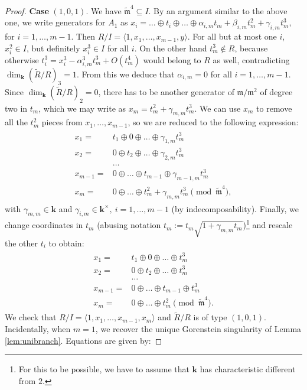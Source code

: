 \documentclass{compositio}
\renewcommand{\k}{\mathbf k}
\newcommand{\m}{\mathfrak m}
\newcommand{\tR}{\widetilde{R}}
\newcommand{\tm}{\widetilde{\mathfrak m}}
\theoremstyle{plain}
\theoremstyle{definition}
\theoremstyle{remark}
\begin{document}
\begin{proof}
 \smallskip
 
 \textbf{Case} $(1,0,1)$. We have $\tm^4\subseteq I$. By an argument similar to the above one, we write generators for $A_1$ as $x_i=\ldots\oplus t_i\oplus\ldots \oplus\alpha_{i,m}t_m+\beta_{i,m}t_m^2+\gamma_{i,m}t_m^3$, for $i=1,\ldots,m-1$.
 Then $R/I=\langle 1,x_1,\ldots,x_{m-1},y\rangle$. For all but at most one $i$, $x_i^2\in I$, but definitely $x_i^3\in I$ for all $i$. On the other hand $t_m^3\notin R$, because otherwise $t_i^3=x_i^3-\alpha_{i,m}^3t_m^3+O(t_m^4)$ would belong to $R$ as well, contradicting $\dim_\k(\tR/R)_3=1$. From this we deduce that $\alpha_{i,m}=0$ for all $i=1,\ldots,m-1$. Since $\dim_\k(\tR/R)_2=0$, there has to be another generator of $\m/\m^2$ of degree two in $t_m$, which we may write as $x_m=t_m^2+\gamma_{m,m}t_m^3$. We can use $x_m$ to remove all the $t_m^2$ pieces from $x_1,\ldots,x_{m-1}$, so we are reduced to the following expression:
  \begin{align}\label{coordIII-cs}
 \begin{split}
  x_1= & t_1\oplus0\oplus\ldots\oplus \gamma_{1,m}t_m^3\\
  x_2= & 0\oplus t_2\oplus\ldots\oplus \gamma_{2,m}t_m^3\\
  &\ldots\\
  x_{m-1}= & 0\oplus\ldots\oplus t_{m-1}\oplus \gamma_{m-1,m}t_m^3\\
  x_m= & 0\oplus\ldots\oplus t_m^2+\gamma_{m,m}t_m^3 \pmod{\tm^4},
  \end{split}
 \end{align}
 with $\gamma_{m,m}\in\k$ and $\gamma_{i,m}\in\k^\times,\ i=1,\ldots,m-1$ (by indecomposability). Finally, we change coordinates in $t_m$ (abusing notation $t_m:=t_m\sqrt{1+\gamma_{m,m}t_m}$)\footnote{For this to be possible, we have to assume that $\k$ has characteristic different from $2$.} and rescale the other $t_i$ to obtain:
 \begin{align}\label{coordIII}
 \begin{split}
  x_1= & t_1\oplus0\oplus\ldots\oplus t_m^3\\
  x_2= & 0\oplus t_2\oplus\ldots\oplus t_m^3\\
  &\ldots\\
  x_{m-1}= & 0\oplus\ldots\oplus t_{m-1}\oplus t_m^3\\
  x_m= & 0\oplus\ldots\oplus t_m^2 \pmod{\tm^4}.
  \end{split}
 \end{align}
 We check that $R/I=\langle 1,x_1,\ldots,x_{m-1},x_m\rangle$ and $\tR/R$ is of type $(1,0,1)$. Incidentally, when $m=1$, we recover the unique Gorenstein singularity of Lemma \ref{lem:unibranch}. Equations are given by:

\end{proof}
\end{document}
